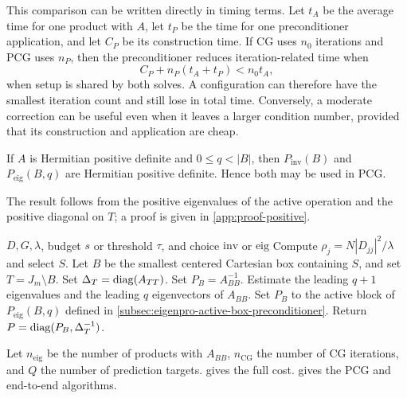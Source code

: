 This comparison can be written directly in timing terms. Let \(t_A\) be the
average time for one product with \(A\), let \(t_P\) be the time for one
preconditioner application, and let \(C_P\) be its construction time. If CG
uses \(n_0\) iterations and PCG uses \(n_P\), then the preconditioner reduces
iteration-related time when
\[
    C_P+n_P(t_A+t_P)<n_0t_A,
\]
when setup is shared by both solves. A configuration can therefore
have the smallest iteration count and still lose in total time. Conversely, a
moderate correction can be useful even when it leaves a larger condition
number, provided that its construction and application are cheap.

\begin{proposition}
\label{prop:preconditioners-positive}
If \(A\) is Hermitian positive definite and \(0\leq q<|B|\), then
\(P_{\mathrm{inv}}(B)\) and \(P_{\mathrm{eig}}(B,q)\) are Hermitian positive
definite. Hence both may be used in PCG.
\end{proposition}

The result follows from the positive eigenvalues of the active operation and
the positive diagonal on \(T\); a proof is given in \cref{app:proof-positive}.

\begin{algorithm}[H]
\caption{Construct the active-box preconditioner}
\label{alg:build-active-box-precond}
\begin{algorithmic}[1]
\Require \(D,G,\lambda\), budget \(s\) or threshold \(\tau\), and choice
\(\mathrm{inv}\) or \(\mathrm{eig}\)
\State Compute \(\rho_j=N|D_{jj}|^2/\lambda\) and select \(S\).
\State Let \(B\) be the smallest centered Cartesian box containing \(S\),
and set \(T=J_m\setminus B\).
\State Set \(\Delta_T=\operatorname{diag}(A_{TT})\).
    \State Set \(P_B=A_{BB}^{-1}\).
\Else
    \State Estimate the leading \(q+1\) eigenvalues and the leading \(q\)
    eigenvectors of \(A_{BB}\).
    \State Set \(P_B\) to the active block of \(P_{\mathrm{eig}}(B,q)\) defined in
    \cref{subsec:eigenpro-active-box-preconditioner}.
\EndIf
\State Return \(P=\operatorname{diag}(P_B,\Delta_T^{-1})\).
\end{algorithmic}
\end{algorithm}

Let \(n_{\mathrm{eig}}\) be the number of products with \(A_{BB}\),
\(n_{\mathrm{CG}}\) the number of CG iterations, and \(Q\) the number of
prediction targets.  gives the full cost.
 gives the PCG and end-to-end algorithms.


